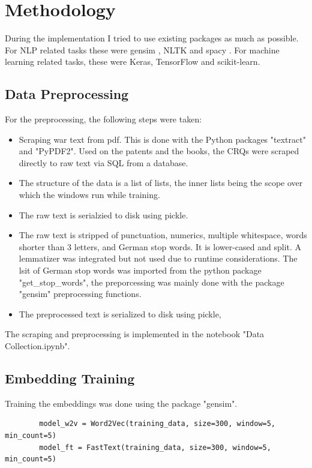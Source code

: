\documentclass[10pt,a4paper]{article}
\begin{document}
	\section{Methodology}
	
	During the implementation I tried to use existing packages as much as possible. For NLP related tasks these were gensim \cite{rehurek_lrec}, NLTK \cite{Loper:2002:NNL:1118108.1118117} and spacy \cite{spacy2}. For machine learning related tasks, these were Keras, TensorFlow and scikit-learn.
	
	
	\subsection{Data Preprocessing}
	For the preprocessing, the following steps were taken:
	\begin{itemize}
		\item Scraping war text from pdf. This is done with the Python packages "textract" and "PyPDF2". Used on the patents and the books, the CRQs were scraped directly to raw text via SQL from a database.
		\item The structure of the data is a list of lists, the inner lists being the scope over which the windows run while training.
		\item The raw text is serialzied to disk using pickle.
		\item The raw text is stripped of punctuation, numerics, multiple whitespace, words shorter than 3 letters, and German stop words. It is lower-cased and split. A lemmatizer was integrated but not used due to runtime considerations. The lsit of German stop words was imported from the python package "get\_stop\_words", the preporcessing was mainly done with the package "gensim" preprocessing functions.
		\item The preprocessed text is serialized to disk using pickle,
	\end{itemize}
    The scraping and preprocessing is implemented in the notebook "Data Collection.ipynb". 
    
	\subsection{Embedding Training}
	
	Training the embeddings was done using the package "gensim". 
	
	\begin{verbatim}
		model_w2v = Word2Vec(training_data, size=300, window=5, min_count=5)
		model_ft = FastText(training_data, size=300, window=5, min_count=5)
	\end{verbatim}
	
\end{document}

